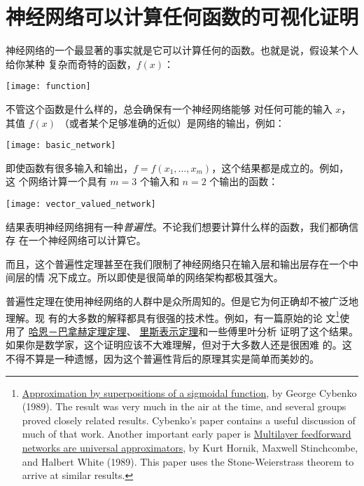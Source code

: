 
\chapter{神经网络可以计算任何函数的可视化证明}
\label{ch:VisualProof}

神经网络的一个最显著的事实就是它可以计算任何的函数。也就是说，假设某个人给你某种
复杂而奇特的函数，$f(x)$：
\begin{center}
  \texttt{[image: function]}
\end{center}

\label{basic_network_precursor}不管这个函数是什么样的，总会确保有一个神经网络能够
对任何可能的输入 $x$，其值 $f(x)$ （或者某个足够准确的近似）是网络的输出，例如：
\begin{center}
  \texttt{[image: basic\_network]}
\end{center}

即使函数有很多输入和输出，$f = f(x_1, \ldots, x_m)$，这个结果都是成立的。例如，这
个网络计算一个具有 $m = 3$ 个输入和 $n = 2$ 个输出的函数：
\begin{center}
  \texttt{[image: vector\_valued\_network]}
\end{center}

结果表明神经网络拥有一种\emph{普遍性}。不论我们想要计算什么样的函数，我们都确信存
在一个神经网络可以计算它。

而且，这个普遍性定理甚至在我们限制了神经网络只在输入层和输出层存在一个中间层的情
况下成立。所以即使是很简单的网络架构都极其强大。

普遍性定理在使用神经网络的人群中是众所周知的。但是它为何正确却不被广泛地理解。现
有的大多数的解释都具有很强的技术性。例如，有一篇原始的论
文\footnote{\href{http://www.dartmouth.edu/~gvc/Cybenko_MCSS.pdf}{Approximation
    by superpositions of a sigmoidal function}, by George Cybenko (1989). The
  result was very much in the air at the time, and several groups proved closely
  related results. Cybenko's paper contains a useful discussion of much of that
  work. Another important early paper is
  \href{http://www.sciencedirect.com/science/article/pii/0893608089900208}{Multilayer
    feedforward networks are universal approximators}, by Kurt Hornik, Maxwell
  Stinchcombe, and Halbert White (1989). This paper uses the Stone-Weierstrass
  theorem to arrive at similar results.}使用了%
\href{https://zh.wikipedia.org/wiki/哈恩－巴拿赫定理}{哈恩－巴拿赫定理定理}、%
\href{https://zh.wikipedia.org/wiki/里斯表示定理}{里斯表示定理}和一些傅里叶分析
证明了这个结果。如果你是数学家，这个证明应该不大难理解，但对于大多数人还是很困难
的。这不得不算是一种遗憾，因为这个普遍性背后的原理其实是简单而美妙的。

